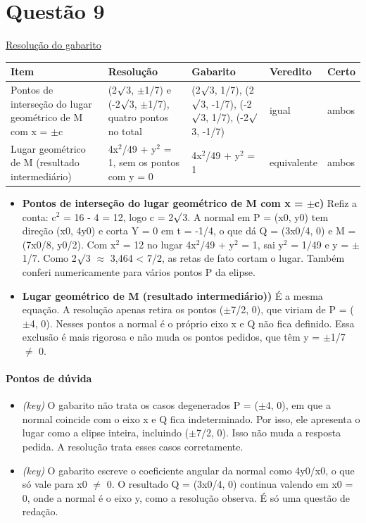 \documentclass{article}%
\begin{document}
\section*{Questão 9}%
\href{https://poliedroresolve.sistemapoliedro.com.br/vestibulares/ime/2027/ime-2-fase-dia-1-26-10-2026-2-fase-dia-1/dissertativa-9-matematica-2-fase-dia-1-ime-2027}{Resolução do gabarito}\par\smallskip%
\begin{longtable}{@{}p{} p{} p{} p{} p{}@{}}\toprule Item & Resolução & Gabarito & Veredito & Certo \\ \midrule
Pontos de interseção do lugar geométrico de M com x = $\pm$c & (2$\surd$3, $\pm$1/7) e (-2$\surd$3, $\pm$1/7), quatro pontos no total & (2$\surd$3, 1/7), (2$\surd$3, -1/7), (-2$\surd$3, 1/7), (-2$\surd$3, -1/7) & igual & ambos \\
Lugar geométrico de M (resultado intermediário) & 4x$^2$/49 + y$^2$ = 1, sem os pontos com y = 0 & 4x$^2$/49 + y$^2$ = 1 & equivalente & ambos \\
\bottomrule\end{longtable}%
\begin{itemize}%
\item%
\textbf{Pontos de interseção do lugar geométrico de M com x = $\pm$c)} Refiz a conta: c$^2$ = 16 - 4 = 12, logo c = 2$\surd$3. A normal em P = (x0, y0) tem direção (x0, 4y0) e corta Y = 0 em t = -1/4, o que dá Q = (3x0/4, 0) e M = (7x0/8, y0/2). Com x$^2$ = 12 no lugar 4x$^2$/49 + y$^2$ = 1, sai y$^2$ = 1/49 e y = $\pm$1/7. Como 2$\surd$3 $\approx$ 3,464 < 7/2, as retas de fato cortam o lugar. Também conferi numericamente para vários pontos P da elipse.%
\item%
\textbf{Lugar geométrico de M (resultado intermediário))} É a mesma equação. A resolução apenas retira os pontos ($\pm$7/2, 0), que viriam de P = ($\pm$4, 0). Nesses pontos a normal é o próprio eixo x e Q não fica definido. Essa exclusão é mais rigorosa e não muda os pontos pedidos, que têm y = $\pm$1/7 $\neq$ 0.%
\end{itemize}%
\paragraph{Pontos de dúvida}%
\begin{itemize}%
\item%
\textit{(key)} O gabarito não trata os casos degenerados P = ($\pm$4, 0), em que a normal coincide com o eixo x e Q fica indeterminado. Por isso, ele apresenta o lugar como a elipse inteira, incluindo ($\pm$7/2, 0). Isso não muda a resposta pedida. A resolução trata esses casos corretamente.%
\item%
\textit{(key)} O gabarito escreve o coeficiente angular da normal como 4y0/x0, o que só vale para x0 $\neq$ 0. O resultado Q = (3x0/4, 0) continua valendo em x0 = 0, onde a normal é o eixo y, como a resolução observa. É só uma questão de redação.%
\end{itemize}%
\end{document}

